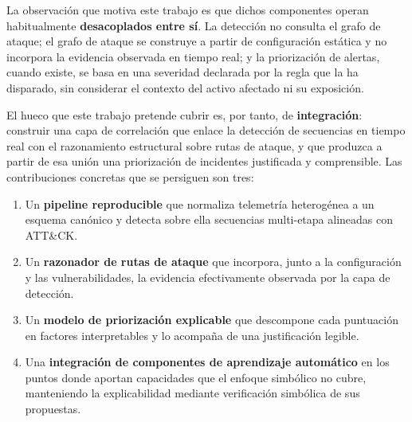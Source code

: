 La observación que motiva este trabajo es que dichos componentes operan habitualmente
\textbf{desacoplados entre sí}. La detección no consulta el grafo de ataque; el grafo de
ataque se construye a partir de configuración estática y no incorpora la evidencia observada
en tiempo real; y la priorización de alertas, cuando existe, se basa en una severidad
declarada por la regla que la ha disparado, sin considerar el contexto del activo afectado
ni su exposición.

El hueco que este trabajo pretende cubrir es, por tanto, de \textbf{integración}: construir
una capa de correlación que enlace la detección de secuencias en tiempo real con el
razonamiento estructural sobre rutas de ataque, y que produzca a partir de esa unión una
priorización de incidentes justificada y comprensible. Las contribuciones concretas que se
persiguen son tres:

\begin{enumerate}
    \item Un \textbf{pipeline reproducible} que normaliza telemetría heterogénea a un
    esquema canónico y detecta sobre ella secuencias multi-etapa alineadas con ATT\&CK.
    \item Un \textbf{razonador de rutas de ataque} que incorpora, junto a la configuración y
    las vulnerabilidades, la evidencia efectivamente observada por la capa de detección.
    \item Un \textbf{modelo de priorización explicable} que descompone cada puntuación en
    factores interpretables y lo acompaña de una justificación legible.
    \item Una \textbf{integración de componentes de aprendizaje automático} en los puntos
    donde aportan capacidades que el enfoque simbólico no cubre, manteniendo la
    explicabilidad mediante verificación simbólica de sus propuestas.
\end{enumerate}

